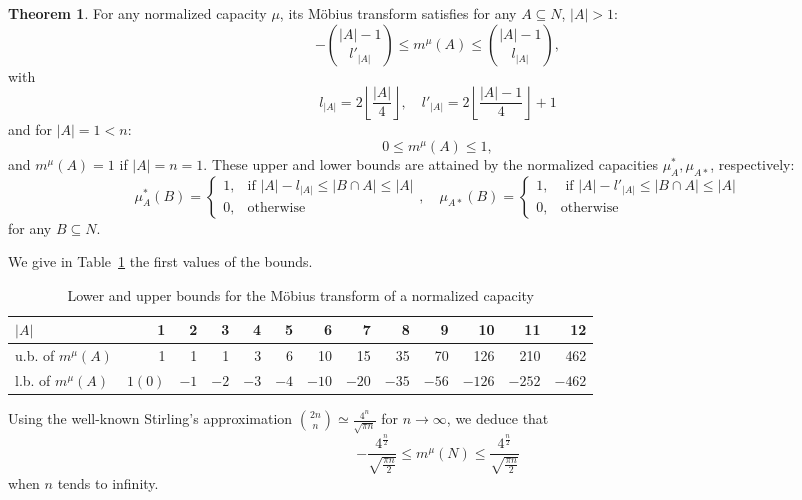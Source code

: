 \documentclass[12pt,a4paper]{article}
\theoremstyle{definition}
\newtheorem{theorem}{Theorem}
\theoremstyle{remark}
\begin{document}
\begin{theorem}\label{th:2.boundM}
For any normalized capacity $\mu$, its M\"obius transform satisfies for any
$A\subseteq N$, $|A|>1$:
\[
-\binom{|A|-1}{l'_{|A|}} \leqslant m^\mu(A)\leqslant \binom{|A|-1}{l_{|A|}},
\]
with
\begin{equation}\label{eq:boundm}
l_{|A|}  = 2\left\lfloor \frac{|A|}{4}\right\rfloor, \quad
l'_{|A|}  = 2\left\lfloor \frac{|A|-1}{4}\right\rfloor +1
\end{equation}
and for $|A|=1<n$:
\[
0\leqslant m^\mu(A) \leqslant 1,
\]
and $m^\mu(A)=1$ if $|A|=n=1$.
These upper and  lower bounds are attained by the normalized capacities
$\mu^*_A,\mu_{A*}$, respectively:
\[
\mu^*_A(B) = \begin{cases}
1, &\text{if } |A|-l_{|A|}\leqslant |B\cap A|\leqslant |A|\\ 0, & \text{otherwise}
\end{cases},\quad \mu_{A*}(B) = \begin{cases}
1, &\text{ if } |A|-l'_{|A|}\leqslant |B\cap A|\leqslant |A|\\ 0, & \text{otherwise}\end{cases}
\]
for any $B\subseteq N$.
\end{theorem}

We give in Table~\ref{tab:2.mobb} the first values of the bounds.
\begin{table}[htb]
\begin{tabular}{|l|rrrrrrrrrrrr|}\hline
$|A|$ & 1 & 2 & 3 & 4 & 5 & 6 & 7 & 8 & 9 & 10 & 11 & 12\\ \hline
u.b. of $m^\mu(A)$ & 1 & 1 & 1 & 3 & 6 & 10 & 15 & 35 & 70 & 126 & 210 & 462\\ \hline
l.b. of $m^\mu(A)$ & $1(0)$ & $-1$ & $-2$ & $-3$ & $-4$ & $-10$ & $-20$ & $-35$ & $-56$ &
$-126$ & $-252$ & $-462$ \\ \hline
\end{tabular}
\caption{Lower and upper bounds for the M\"obius transform of a normalized
  capacity}
\label{tab:2.mobb}
\end{table}
Using the well-known Stirling's approximation
$\binom{2n}{n}\simeq\frac{4^n}{\sqrt{\pi n}}$ for $n\rightarrow\infty$, we
deduce that
\[
-\frac{4^{\frac{n}{2}}}{\sqrt{\frac{\pi n}{2}}}\leqslant m^\mu(N)\leqslant
\frac{4^{\frac{n}{2}}}{\sqrt{\frac{\pi n}{2}}}
\]
when $n$ tends to infinity.
\end{document}

